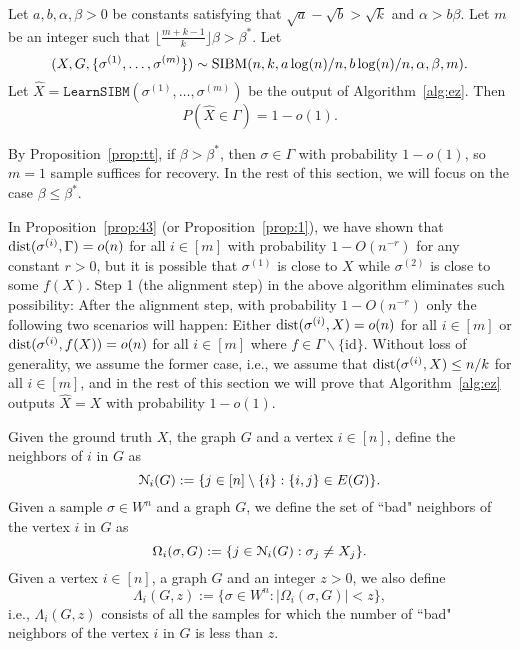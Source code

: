 \documentclass{article}
\begin{document}
\begin{proposition} \label{prop:nr}
	Let $a,b,\alpha,\beta> 0$ be constants satisfying that $\sqrt{a}-\sqrt{b} > \sqrt{k}$ and $\alpha>b\beta$. Let $m$ be an integer such that $\lfloor \frac{m+k-1}{k} \rfloor \beta>\beta^\ast$.
	Let 
	$$
	(X,G,\{\sigma^{(1)},\dots,\sigma^{(m)}\})\sim \operatorname{SIBM}(n,k, a\log(n)/n, b\log(n)/n,\alpha,\beta, m) .
	$$
	Let $\hat{X}=\texttt{LearnSIBM}(\sigma^{(1)},\dots,\sigma^{(m)})$ be the output of Algorithm~\ref{alg:ez}. Then
	$$
	P(\hat{X} \in \Gamma) = 1-o(1) .
	$$
\end{proposition}

By Proposition~\ref{prop:tt},
if $\beta>\beta^\ast$, then $\sigma \in \Gamma $ with probability $1-o(1)$, so $m=1$ sample suffices for recovery. In the rest of this section, we will focus on the case $\beta\le \beta^\ast$.

In Proposition~\ref{prop:43} (or Proposition~\ref{prop:1}), we have shown that $\operatorname{dist}(\sigma^{(i)}, \Gamma) =o(n)$ for all $i\in[m]$ with probability $1-O(n^{-r})$ for any constant $r>0$, but it is possible that $\sigma^{(1)}$ is close to $X$ while $\sigma^{(2)}$ is close to some $f(X)$. Step 1 (the alignment step) in the above algorithm eliminates such possibility: After the alignment step, with probability $1-O(n^{-r})$ only the following two scenarios will happen: Either
$\operatorname{dist}(\sigma^{(i)}, X)=o(n)$ for all $i\in[m]$ or $\operatorname{dist}(\sigma^{(i)}, f(X))=o(n)$ for all $i\in[m]$ where $f \in \Gamma \backslash \{\textrm{id}\}$. Without loss of generality, we assume the former case, i.e., we assume that 
$\operatorname{dist}(\sigma^{(i)}, X) \le n/k$ for all $i\in[m]$,
and in the rest of this section we will prove that Algorithm~\ref{alg:ez} outputs $\hat{X}=X$ with probability $1-o(1)$.


Given the ground truth $X$, the graph $G$ and a vertex $i\in[n]$, define the neighbors of $i$ in $G$ as 
\begin{equation} \label{eq:ngbi}
\mathcal{N}_i(G) := \{j\in[n]\setminus\{i\}:
\{i,j\}\in E(G) \} .
\end{equation}
Given a sample $\sigma\in W^n$ and a graph $G$,  we define the set of ``bad" neighbors of the vertex $i$ in $G$ as
$$
\Omega_i(\sigma,G):=\{j\in \mathcal{N}_i(G): 
\sigma_j \neq X_j \} .
$$
Given a vertex $i\in[n]$, a graph $G$ and an integer $z>0$, we also define
$$
\Lambda_i(G, z):=\{ \sigma\in W^n: |\Omega_i(\sigma,G)| < z \} ,
$$
i.e., $\Lambda_i(G, z)$ consists of all the samples for which the number of ``bad" neighbors of the vertex $i$ in $G$ is less than $z$.
\end{document}
